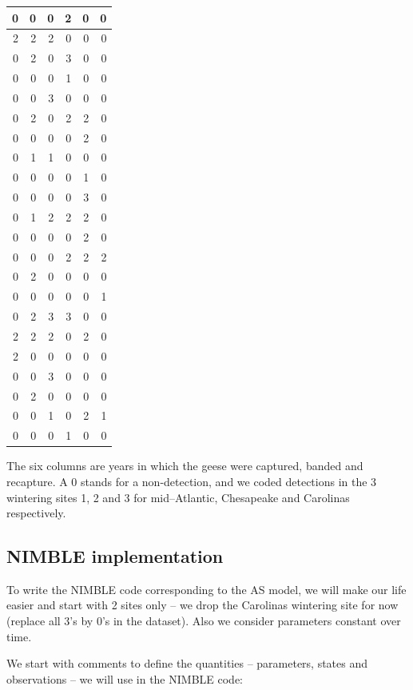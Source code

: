 \documentclass[
  12pt,
]{krantz}
\begin{document}
\begin{tabular}{r|r|r|r|r|r}
\hline
0 & 0 & 0 & 2 & 0 & 0\\
\hline
2 & 2 & 2 & 0 & 0 & 0\\
\hline
0 & 2 & 0 & 3 & 0 & 0\\
\hline
0 & 0 & 0 & 1 & 0 & 0\\
\hline
0 & 0 & 3 & 0 & 0 & 0\\
\hline
0 & 2 & 0 & 2 & 2 & 0\\
\hline
0 & 0 & 0 & 0 & 2 & 0\\
\hline
0 & 1 & 1 & 0 & 0 & 0\\
\hline
0 & 0 & 0 & 0 & 1 & 0\\
\hline
0 & 0 & 0 & 0 & 3 & 0\\
\hline
0 & 1 & 2 & 2 & 2 & 0\\
\hline
0 & 0 & 0 & 0 & 2 & 0\\
\hline
0 & 0 & 0 & 2 & 2 & 2\\
\hline
0 & 2 & 0 & 0 & 0 & 0\\
\hline
0 & 0 & 0 & 0 & 0 & 1\\
\hline
0 & 2 & 3 & 3 & 0 & 0\\
\hline
2 & 2 & 2 & 0 & 2 & 0\\
\hline
2 & 0 & 0 & 0 & 0 & 0\\
\hline
0 & 0 & 3 & 0 & 0 & 0\\
\hline
0 & 2 & 0 & 0 & 0 & 0\\
\hline
0 & 0 & 1 & 0 & 2 & 1\\
\hline
0 & 0 & 0 & 1 & 0 & 0\\
\hline
\end{tabular}

The six columns are years in which the geese were captured, banded and recapture. A 0 stands for a non-detection, and we coded detections in the 3 wintering sites 1, 2 and 3 for mid--Atlantic, Chesapeake and Carolinas respectively.

\hypertarget{nimble-implementation-2}{%
\subsection{NIMBLE implementation}\label{nimble-implementation-2}}

To write the NIMBLE code corresponding to the AS model, we will make our life easier and start with 2 sites only -- we drop the Carolinas wintering site for now (replace all 3's by 0's in the dataset). Also we consider parameters constant over time.

We start with comments to define the quantities -- parameters, states and observations -- we will use in the NIMBLE code:
\end{document}

